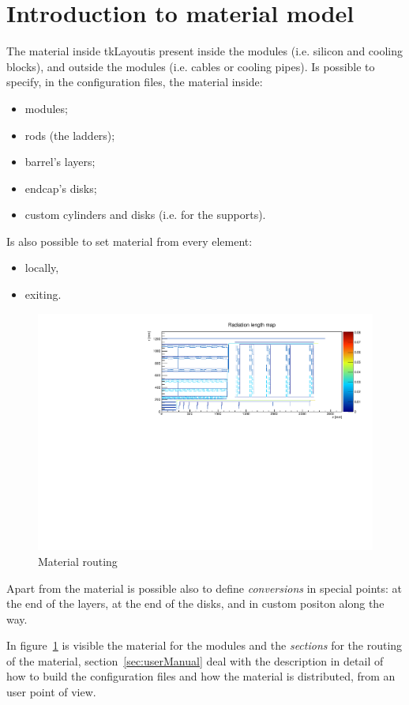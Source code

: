 \documentclass[12pt, a4paper]{article}
\newcommand{\tkl}{tkLayout}
\begin{document}
\section{Introduction to material model}
The material inside \tkl is present inside the modules (i.e. silicon
and cooling blocks),
and outside the modules (i.e. cables or cooling pipes). Is possible to
specify, in the configuration files, the material inside:
\begin{itemize}
\item modules;
\item rods (the ladders);
\item barrel's layers;
\item endcap's disks;
\item custom cylinders and disks (i.e. for the supports).
\end{itemize}
Is also possible to set material from every element:
\begin{itemize}
\item locally,
\item exiting.
\end{itemize}

\begin{figure}[h]
  \centering
  \includegraphics[width=\textwidth]{img/materialMap.pdf}  
  \caption{Material routing}
  \label{fig:materialMap}
\end{figure}

Apart from the material is possible also to define \emph{conversions}
in special points: at the end of the layers, at the end of the disks,
and in custom positon along the way.

In figure~\ref{fig:materialMap}
is visible the material for the modules and the \emph{sections} for
the routing of the material, section~\ref{sec:userManual} deal with
the description in detail of how to build the configuration files and
how the material is distributed, from an user point of view.
\end{document}
